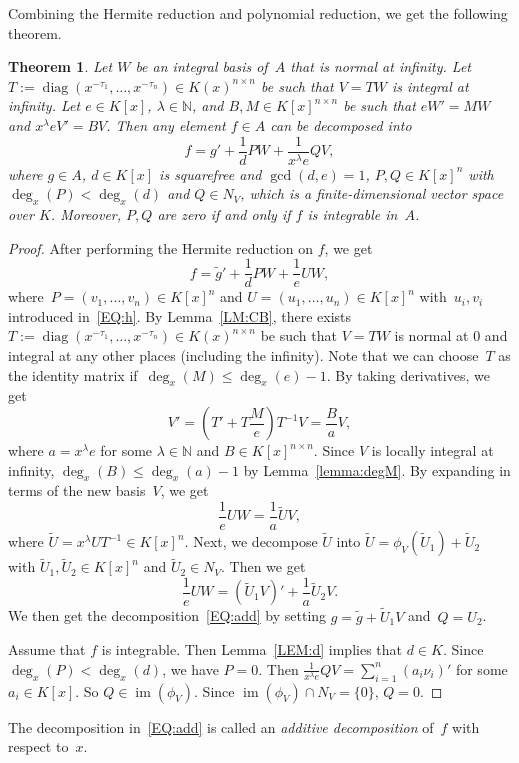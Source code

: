 \documentclass{sig-alternate}
\newtheorem{theorem}{Theorem}
\newcommand{\bN}{ {\mathbb N}}
\def\im{\operatorname{im}}
\def\diag{\operatorname{diag}}
\begin{document}
Combining the Hermite reduction and polynomial reduction, we get the following theorem.
\begin{theorem}\label{THM:polyred}
Let $W$ be an integral basis of~$A$ that is normal at infinity.
Let $T := \diag(x^{-\tau_1}, \ldots, x^{-\tau_n}) \in K(x)^{n\times n}$
be such that $V = TW$ is integral at infinity.
Let $e\in K[x]$, $\lambda \in \bN$, and $B, M \in K[x]^{n \times n} $ be such that
$eW' = MW$ and $x^\lambda eV' = BV$.
Then any element $f\in A$ can be decomposed into
\begin{equation}\label{EQ:add}
f = g' + \frac{1}{d} PW + \frac{1}{x^\lambda e} QV,
\end{equation}
where $g\in A$, $d\in K[x]$ is squarefree and $\gcd(d, e)=1$, $P, Q\in K[x]^n$ with $\deg_x(P) < \deg_x(d)$ and $Q\in N_V$, which is
a finite-dimensional vector space over $K$. Moreover, $P, Q$ are zero if and only if $f$ is integrable in~$A$.
\end{theorem}
\begin{proof}
After performing the Hermite reduction on $f$, we get
\[f = \tilde{g}' + \frac{1}{d} PW + \frac{1}{e} UW,\]
where~$P = (v_1, \ldots, v_n)\in K[x]^n$ and $U = (u_1, \ldots, u_n)\in K[x]^n$
with~$u_i, v_i$ introduced in~\eqref{EQ:h}. By Lemma~\ref{LM:CB}, there exists
$T := \diag(x^{-\tau_1}, \ldots, x^{-\tau_n}) \in K(x)^{n\times n}$
be such that $V = TW$ is normal at $0$ and integral at any other places (including the infinity). Note that we can
choose~$T$ as the identity matrix if~$\deg_x(M)\leq \deg_x(e)-1$.
By taking derivatives, we get
\[V' = \left(T' + T\frac{M}{e}\right)T^{-1}V = \frac{B}{a}V, \]
where $a=x^\lambda e$ for some $\lambda\in \bN$ and $B\in K[x]^{n\times n}$. Since $V$ is locally integral
at infinity, $\deg_x(B) \leq \deg_x(a)-1$ by Lemma~\ref{lemma:degM}.
By expanding in terms of the new basis~$V$, we get
\[\frac{1}{e} UW = \frac{1}{a} \tilde{U}V, \]
where $\tilde{U} = x^\lambda U T^{-1} \in K[x]^n$. Next, we decompose $\tilde{U}$ into
$\tilde{U} = \phi_{V}(\tilde{U}_1) + \tilde{U}_2$ with $\tilde{U}_1, \tilde{U}_2\in K[x]^n$ and
$\tilde{U}_2\in N_V$. Then we get
\[\frac{1}{e} UW = (\tilde U_1 V)' + \frac{1}{a} \tilde U_2 V. \]
We then get the decomposition~\eqref{EQ:add} by setting
$g = \tilde g + \tilde U_1 V$ and~$Q = U_2$.

Assume that $f$ is integrable. Then Lemma~\ref{LEM:d} implies that $d\in K$.
Since $\deg_x(P) < \deg_x(d)$, we have $P=0$. Then $\frac{1}{x^\lambda e} QV = \sum_{i=1}^n (a_i \nu_i)'$
for some $a_i\in K[x]$. So $Q \in \im(\phi_V)$.
Since $\im(\phi_V) \cap N_V = \{0\}$, $Q=0$.
\end{proof}
The decomposition in~\eqref{EQ:add} is called an \emph{additive decomposition} of~$f$ with respect to~$x$.
\end{document}
